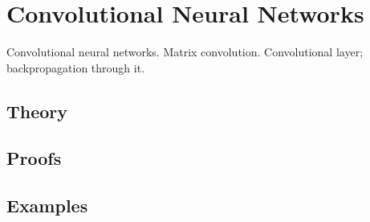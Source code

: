 
\section{Convolutional Neural Networks}
\label{sec:1.4.13-cnn}

\begin{ticket}
Convolutional neural networks. Matrix convolution. Convolutional layer; backpropagation through it.
\end{ticket}

\subsection*{Theory}

\subsection*{Proofs}

\subsection*{Examples}
